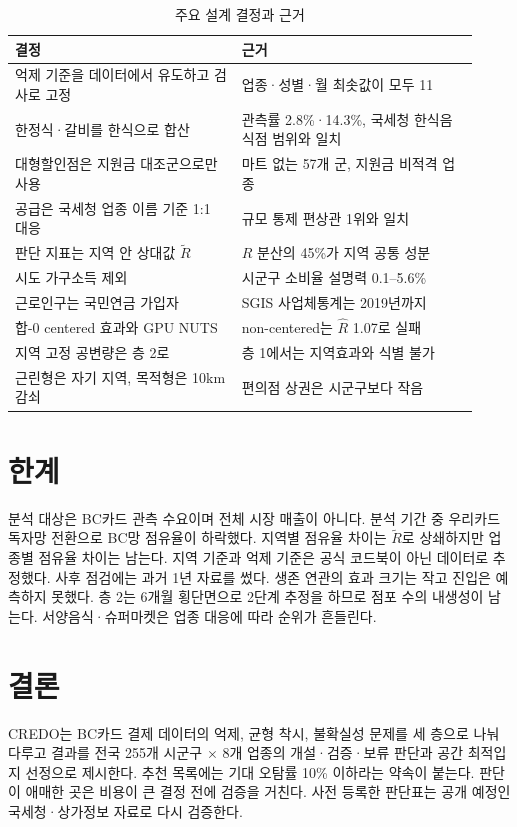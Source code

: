 \documentclass[journal,a4paper]{IEEEtran}
\begin{document}
\begin{table}[t]
\centering
\caption{주요 설계 결정과 근거}
\label{tab:decisions}
{\footnotesize\setlength{\tabcolsep}{3pt}
\begin{tabular}{L{0.45\linewidth}L{0.47\linewidth}}
\toprule
결정 & 근거 \\\midrule
억제 기준을 데이터에서 유도하고 검사로 고정 & 업종·성별·월 최솟값이 모두 11 \\
한정식·갈비를 한식으로 합산 & 관측률 2.8\%·14.3\%, 국세청 한식음식점 범위와 일치 \\
대형할인점은 지원금 대조군으로만 사용 & 마트 없는 57개 군, 지원금 비적격 업종 \\
공급은 국세청 업종 이름 기준 1:1 대응 & 규모 통제 편상관 1위와 일치 \\
판단 지표는 지역 안 상대값 $\tilde R$ & $R$ 분산의 45\%가 지역 공통 성분 \\
시도 가구소득 제외 & 시군구 소비율 설명력 0.1--5.6\% \\
근로인구는 국민연금 가입자 & SGIS 사업체통계는 2019년까지 \\
합-0 centered 효과와 GPU NUTS & non-centered는 $\hat R$ 1.07로 실패 \\
지역 고정 공변량은 층 2로 & 층 1에서는 지역효과와 식별 불가 \\
근린형은 자기 지역, 목적형은 10km 감쇠 & 편의점 상권은 시군구보다 작음 \\
\bottomrule
\end{tabular}}
\end{table}

\section{한계}
분석 대상은 BC카드 관측 수요이며 전체 시장 매출이 아니다. 분석 기간 중 우리카드 독자망 전환으로 BC망 점유율이 하락했다. 지역별 점유율 차이는 $\tilde R$로 상쇄하지만 업종별 점유율 차이는 남는다. 지역 기준과 억제 기준은 공식 코드북이 아닌 데이터로 추정했다. 사후 점검에는 과거 1년 자료를 썼다. 생존 연관의 효과 크기는 작고 진입은 예측하지 못했다. 층 2는 6개월 횡단면으로 2단계 추정을 하므로 점포 수의 내생성이 남는다. 서양음식·슈퍼마켓은 업종 대응에 따라 순위가 흔들린다.

\section{결론}
CREDO는 BC카드 결제 데이터의 억제, 균형 착시, 불확실성 문제를 세 층으로 나눠 다루고 결과를 전국 255개 시군구 $\times$ 8개 업종의 개설·검증·보류 판단과 공간 최적입지 선정으로 제시한다. 추천 목록에는 기대 오탐률 10\% 이하라는 약속이 붙는다. 판단이 애매한 곳은 비용이 큰 결정 전에 검증을 거친다. 사전 등록한 판단표는 공개 예정인 국세청·상가정보 자료로 다시 검증한다.
\end{document}
